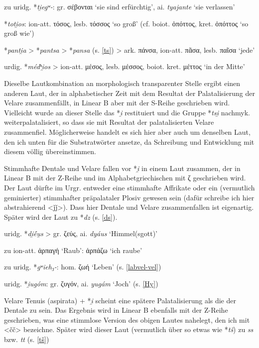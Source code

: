 \documentclass[12pt,a4paper,normalheadings]{scrartcl}
\def\rek#1{\mbox{*\textit{#1}}}
\def\bel#1{\mbox{\textit{#1}}}
\begin{document}
\lex{\rek{(t, tʰ)i̯}}{\rek{s}}{\#\_}

zu uridg. \rek{ti̯egʷ-}: gr. σέβονται `sie sind erfürchtig', ai. \bel{tyajante} `sie verlassen'

\lex{\rek{(t, tʰ)i̯}}{\rek{ts}}{\_}

\rek{toti̯os}: ion-att. τόσος, lesb. τόσσος `so groß' (cf. boiot. ὁπόττος, kret. ὀπόττος `so groß wie')

\rek{panti̯a} > \rek{pantsa} > \rek{pansa} (s. \ref{ts}) >
ark. πάνσα, ion-att. πᾶσα, lesb. παῖσα `jede'

urdig. \rek{médʰi̯os} > ion-att. μέσος, lesb. μέσσος, boiot. kret. μέττος `in der Mitte'

\bigskip\noindent
Dieselbe Lautkombination an morphologisch transparenter Stelle
ergibt einen anderen Laut,
der in alphabetischer Zeit mit dem Resultat der Palatalisierung der
Velare zusammenfällt,
in Linear B aber mit der S-Reihe geschrieben wird.
Vielleicht wurde an dieser Stelle das \rek{i̯} restituiert
und die Gruppe \rek{tsi̯} nachmyk. weiterpalatalisiert,
so dass sie mit Resultat der palatalisierten Velare zusammenfiel.
Möglicherweise handelt es sich hier aber auch um denselben Laut,
den ich unten für die Substratwörter ansetze,
da Schreibung und Entwicklung mit diesem völlig übereinstimmen.

Stimmhafte Dentale und Velare fallen vor \rek{i̯} in einem Laut zusammen,
der in Linear B mit der Z-Reihe und im Alphabetgriechischen mit ζ
geschrieben wird.
Der Laut dürfte im Urgr. entweder eine stimmhafte Affrikate oder ein
(vermutlich geminierter) stimmhafter präpalataler Plosiv gewesen sein
(dafür schreibe ich hier abstrahierend <ǰǰ>).
Dass hier Dentale und Velare zusammenfallen ist eigenartig.
Später wird der Laut zu \rek{dz} (s. \ref{ds}).

\lex{\rek{(d, g)i̯}}{\rek{ǰǰ}}

uridg. \rek{di̯ḗu̯s} > gr. ζεύς, ai. \bel{dyáus} `Himmel(sgott)'

zu ion-att. ἁρπαγή `Raub': ἁρπάζω `ich raube'

zu uridg. \rek{gʷieh₃-}: hom. ζωή `Leben' (s. \ref{labvel-vel})

uridg. \rek{i̯ugóm}: gr. ζυγόν, ai. \bel{yugám} `Joch' (s. \ref{Hy})

\bigskip\noindent
Velare Tenuis (aspirata) + \rek{i̯} scheint eine spätere Palatalisierung
als die der Dentale zu sein.
Das Ergebnis wird in Linear B ebenfalls mit der Z-Reihe geschrieben,
was eine stimmlose Version des obigen Lautes nahelegt,
den ich mit <čč> bezeichne.
Später wird dieser Laut (vermutlich über so etwas wie \rek{tš})
zu \bel{ss} bzw. \bel{tt} (s. \ref{tš})
\end{document}
